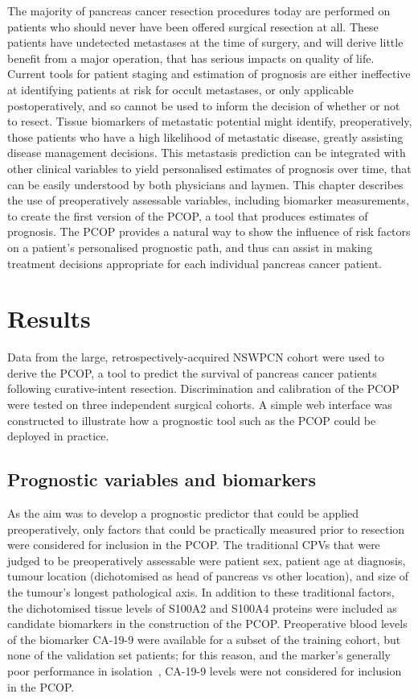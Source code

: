 \documentclass[dissertation.tex]{subfiles}
\begin{document}
The majority of pancreas cancer resection procedures today are performed on patients who should never have been offered surgical resection at all.  These patients have undetected metastases at the time of surgery, and will derive little benefit from a major operation, that has serious impacts on quality of life.  Current tools for patient staging and estimation of prognosis are either ineffective at identifying patients at risk for occult metastases, or only applicable postoperatively, and so cannot be used to inform the decision of whether or not to resect.  Tissue biomarkers of metastatic potential might identify, preoperatively, those patients who have a high likelihood of metastatic disease, greatly assisting disease management decisions.  This metastasis prediction can be integrated with other clinical variables to yield personalised estimates of prognosis over time, that can be easily understood by both physicians and laymen.  This chapter describes the use of preoperatively assessable variables, including biomarker measurements, to create the first version of the \gls{PCOP}, a tool that produces estimates of prognosis.  The \gls{PCOP} provides a natural way to show the influence of risk factors on a patient's personalised prognostic path, and thus can assist in making treatment decisions appropriate for each individual pancreas cancer patient.


\section{Results}
Data from the large, retrospectively-acquired \gls{NSWPCN} cohort were used to derive the \gls{PCOP}, a tool to predict the survival of pancreas cancer patients following curative-intent resection.  Discrimination and calibration of the \gls{PCOP} were tested on three independent surgical cohorts.  A simple web interface was constructed to illustrate how a prognostic tool such as the \gls{PCOP} could be deployed in practice.

\subsection{Prognostic variables and biomarkers}
As the aim was to develop a prognostic predictor that could be applied preoperatively, only factors that could be practically measured prior to resection were considered for inclusion in the \gls{PCOP}.  The traditional \glspl{CPV} that were judged to be preoperatively assessable were patient sex, patient age at diagnosis, tumour location (dichotomised as head of pancreas vs other location), and size of the tumour's longest pathological axis.  In addition to these traditional factors, the dichotomised tissue levels of S100A2 and S100A4 proteins were included as candidate biomarkers in the construction of the \gls{PCOP}.  Preoperative blood levels of the biomarker \gls{CA-19-9} were available for a subset of the training cohort, but none of the validation set patients; for this reason, and the marker's generally poor performance in isolation~\cite{Kim2011}, \gls{CA-19-9} levels were not considered for inclusion in the \gls{PCOP}.
\end{document}
